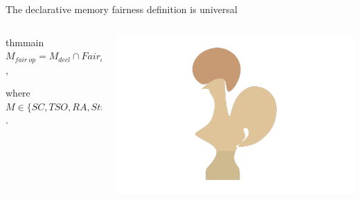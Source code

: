 \newcommand{\tsoEquiv}{
  $TSO_{fair\ op} = TSO_{decl} \cap Fair_{decl}$
}
\begin{frame}{The declarative memory fairness definition is universal}
  \begin{columns}
    
    \begin{column}{0.6\linewidth}
      \begin{center}
        \begin{restatable}{thm}{main}
          $M_{fair\ op} = M_{decl} \cap Fair_{decl}$,
          
          where $M \in \{SC, TSO, RA, StrongCoh\}$.
      \end{restatable}
    \end{center}    
  \end{column}
  
  \begin{column}{0.3\linewidth}
    \includegraphics[width=1\linewidth]{coq.png}
  \end{column}
  
\end{columns}

\end{frame}



